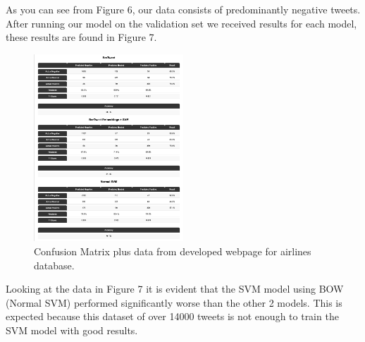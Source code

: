 \documentclass[conference]{IEEEtran}
\begin{document}
As you can see from Figure 6, our data consists of predominantly negative tweets. After running our model on the validation set we received results for each model, these results are found in Figure 7.

\begin{figure}[b!]
    \includegraphics[width=0.5\textwidth]{results.png}
    \caption{Confusion Matrix plus data from developed webpage for airlines database.}
\end{figure}

Looking at the data in Figure 7 it is evident that the SVM model using BOW (Normal SVM) performed significantly worse than the other 2 models. This is expected because this dataset of over 14000 tweets is not enough to train the SVM model with good results. 
\end{document}
